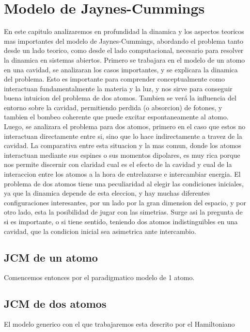 \chapter{Modelo de Jaynes-Cummings}
\label{ch:jcm}

\pagestyle{fancy}
\fancyhf{}
\fancyhead[LE]{\nouppercase{\rightmark\hfill}}
\fancyhead[RO]{\nouppercase{\leftmark\hfill}}
\fancyfoot[LE,RO]{\hfill\thepage\hfill}

En este capitulo analizaremos en profundidad la dinamica y los aspectos teoricos mas importantes 
del modelo de Jaynes-Cummings, abordando el problema tanto desde un lado teorico, como desde
el lado computacional, necesario para resolver la dinamica en sistemas abiertos.
Primero se trabajara en el modelo de un atomo en una cavidad, se analizaran los casos importantes,
y se explicara la dinamica del problema. Esto es importante para comprender conceptualmente como
interactuan fundamentalmente la materia y la luz, y nos sirve para conseguir buena intuicion del
problema de dos atomos. Tambien se ver\'a la influencia del entorno sobre la cavidad, permitiendo
perdida (o absorcion) de fotones, y tambien el bombeo coherente que puede excitar espontaneamente
al atomo. \newline
Luego, se analizara el problema para dos atomos, primero en el caso que estos no interactuan
directamente entre si, sino que lo hace indirectamente a travez de la cavidad. La comparativa entre
esta situacion y la mas comun, donde los atomos interactuan mediante sus espines o sus momentos
dipolares, es muy rica porque nos permite discernir con claridad cual es el efecto de la cavidad
y cual de la interaccion entre los atomos a la hora de entrelazarse e intercambiar energia.
El problema de dos atomos tiene una peculiaridad al elegir las condiciones iniciales, ya que la
dinamica depende de esta eleccion, y hay muchas diferentes configuraciones interesantes, por un lado
por la gran dimension del espacio, y por otro lado, esta la posibilidad de jugar con las simetrias.
Surge asi la pregunta de si es importante, o si tiene sentido, teniendo dos atomos indistinguibles
en una cavidad, que la condicion inicial sea asimetrica ante intercambio. 

\section{JCM de un atomo}
Comencemos entonces por el paradigmatico modelo de 1 atomo. 

\section{JCM de dos atomos}
El modelo generico con el que trabajaremos esta descrito por el Hamiltoniano